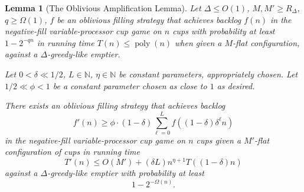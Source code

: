 \documentclass[twocolumn]{article}[10pt]
\DeclareMathOperator{\poly}{\text{poly}}
\newtheorem{lemma}{Lemma}
\begin{document}
\begin{lemma}[The Oblivious Amplification Lemma]
  \label{lem:obliviousAmplification} 
  Let $\Delta \le O(1)$, $M, M' \ge R_\Delta$, $q \ge \Omega(1)$, $f$ be an
  oblivious filling strategy that achieves backlog $f(n)$ in the negative-fill
  variable-processor cup game on $n$ cups with probability at least $1-2^{-qn}$
  in running time $T(n) \le \poly(n)$ when given a $M$-flat configuration,
  against a $\Delta$-greedy-like emptier.

  Let $0< \delta \ll 1/2$, $L\in \mathbb{N}$, $\eta \in \mathbb{N}$ be constant
  parameters, appropriately chosen. Let $1/2 \ll \phi<1$ be a constant
  parameter chosen as close to $1$ as desired. 

  There exists an oblivious filling strategy that achieves backlog $$f'(n) \ge
  \phi \cdot (1-\delta)\sum_{\ell=0}^L f((1-\delta)\delta^\ell n)$$ in the
  negative-fill variable-processor cup game on $n$ cups given a $M'$-flat configuration of
  cups in running time $$T'(n) \le O(M') + (\delta L) n^{\eta+1}
  T((1-\delta)n)$$ against a $\Delta$-greedy-like emptier with probability at
  least $$1-2^{-\Omega(n)}.$$
\end{lemma}
\end{document}
